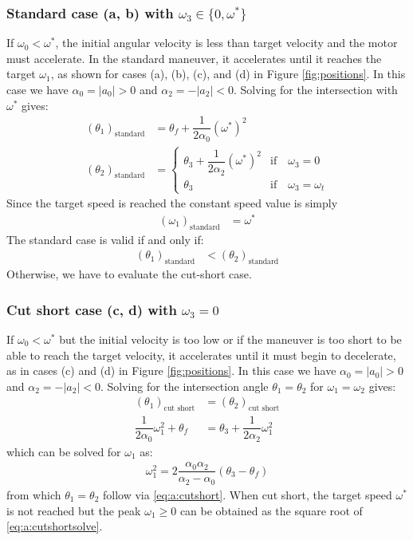 \documentclass[12pt, a4paper]
{article}
\providecommand{\lr}[1]{\left(#1\right)}
\providecommand{\sub}[1]{_{\text{#1}}}
\providecommand{\w}{\omega}
\providecommand{\wt}{\w^*}
\renewcommand{\th}{\theta}
\renewcommand{\a}{\alpha}
\providecommand{\abs}[1]{\left|#1\right|}
\begin{document}
\subsubsection{Standard case (a, b) with $\w_3 \in \{0, \wt\}$}
\label{sec:a:standard}
If $\w_0 < \wt$, the initial angular velocity is less than target velocity and
the motor must accelerate. In the standard maneuver, it accelerates
until it reaches the target $\w_1$, as shown for cases (a), (b), (c), and (d)
in Figure \ref{fig:positions}. In this case we have $\a_0 = \abs{a_0} > 0$
and $\a_2 = -\abs{a_2} < 0$. Solving for the intersection with $\wt$ gives:
%
\begin{align}
    \label{eq:a:t1mt0:standard}
    \lr{\th_1}\sub{standard} &= \th_f  + \dfrac{1}{2\a_0}(\wt)^2\\[1em]
    \lr{\th_2}\sub{standard} &=
        \begin{cases}
        \th_3  + \dfrac{1}{2\a_2}(\wt)^2 & \text{if} \quad \w_3 = 0\\ 
        \th_3 &  \text{if} \quad\w_3 = \w_t
        \end{cases}
\end{align}
%
%
Since the target speed is reached the constant speed value is simply
\begin{align}
    \lr{\w_1}\sub{standard} &= \wt
\end{align}
%
The standard case is valid if and only if:
\begin{align}
    \label{eq:a:t1mt0:standardvalidity}
    \lr{\th_1}\sub{standard} &< \lr{\th_2}\sub{standard}
\end{align}
%
Otherwise, we have to evaluate the cut-short case.
%

\subsubsection{Cut short case (c, d) with $\w_3 = 0$}
\label{sec:a:cutshortw3is0}
If $\w_0 < \wt$ but the initial velocity is too low or if the
maneuver is too short to be able to reach the target velocity, it accelerates
until it must begin to decelerate, as in cases (c) and (d) in
Figure \ref{fig:positions}.
In this case we have $\a_0 = \abs{a_0} > 0$ and $\a_2 = -\abs{a_2} < 0$.
Solving for the intersection angle $\th_1=\th_2$ for $\w_1=\w_2$ gives:
%
\begin{align}
    \label{eq:a:cutshort}
    \lr{\th_1}\sub{cut short} &= \lr{\th_2}\sub{cut short}\\[1em]
    \dfrac{1}{2\a_0}\w_1^2 + \th_f  &= \th_3 + \dfrac{1}{2\a_2} \w_1^2 
\end{align}
%
which can be solved for $\w_1$ as:
%
\begin{align}
    \label{eq:a:cutshortsolve}
    \w_1^2 = 2 \dfrac{\a_0\a_2}{\a_2-\a_0}\lr{\th_3 - \th_f}
\end{align}
%
from which $\th_1=\th_2$ follow via \eqref{eq:a:cutshort}.
%
When cut short, the target speed $\wt$ is not reached but the
peak $\w_1 \geq 0$ can be obtained as the square root
of \eqref{eq:a:cutshortsolve}.
%
\end{document}
